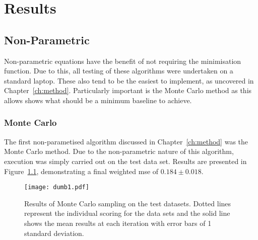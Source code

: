 \chapter{Results}


\graphicspath{{Chapter4/Figs/Vector/}{Chapter4/Figs/}}

\section{Non-Parametric}
Non-parametric equations have the benefit of not requiring the minimisation function. Due to this, all testing of these algorithms were undertaken on a standard laptop. These also tend to be the easiest to implement, as uncovered in Chapter~\ref{ch:method}. Particularly important is the Monte Carlo method as this allows shows what should be a minimum baseline to achieve.

\subsection{Monte Carlo}
The first non-parametised algorithm discussed in Chapter~\ref{ch:method} was the Monte Carlo method. Due to the non-parametric nature of this algorithm, execution was simply carried out on the test data set. Results are presented in Figure~\ref{fig:MCTestSet}, demonstrating a final weighted mse of ${0.184\pm{}0.018}$.
\begin{figure}[h]
    \begin{center}
        \texttt{[image: dumb1.pdf]}
        \caption[Monte Carlo]{Results of Monte Carlo sampling on the test datasets. Dotted lines represent the individual scoring for the data sets and the solid line shows the mean results at each iteration with error bars of 1 standard deviation.}
        \label{fig:MCTestSet}
    \end{center}
\end{figure}

